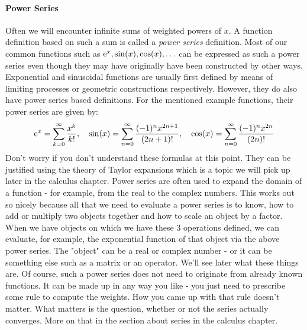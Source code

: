 \paragraph{Power Series}
Often we will encounter infinite sums of weighted powers of $x$. A function definition based on such a sum is called a \emph{power series} definition. Most of our common functions such as $\operatorname{\mathrm{e}}^x, \sin(x), \cos(x), \ldots$ can be expressed as such a power series even though they may have originally have been constructed by other ways. Exponential and sinusoidal functions are usually first defined by means of limiting processes or geometric constructions respectively. However, they do also have power series based definitions. For the mentioned example functions, their power series are given by:
\begin{equation}
\operatorname{\mathrm{e}}^x    = \sum_{k=0}^\infty   \frac{x^k}{k!}, \quad
\sin(x) = \sum_{n=0}^{\infty} \frac{(-1)^n x^{2n+1}}{(2n+1)!}, \quad
\cos(x) = \sum_{n=0}^{\infty} \frac{(-1)^n x^{2n}  }{(2n)!}
\end{equation}
Don't worry if you don't understand these formulas at this point. They can be justified using the theory of Taylor expansions which is a topic we will pick up later in the calculus chapter. Power series are often used to expand the domain of a function - for example, from the real to the complex numbers. This works out so nicely because all that we need to evaluate a power series is to know, how to add or multiply two objects together and how to scale an object by a factor. When we have objects on which we have these 3 operations defined, we can evaluate, for example, the exponential function of that object via the above power series. The "object" can be a real or complex number - or it can be something else such as a matrix or an operator. We'll see later what these things are. Of course, such a power series does not need to originate from already known functions. It can be made up in any way you like - you just need to prescribe some rule to compute the weights. How you came up with that rule doesn't matter. What matters is the question, whether or not the series actually converges. More on that in the section about series in the calculus chapter.

